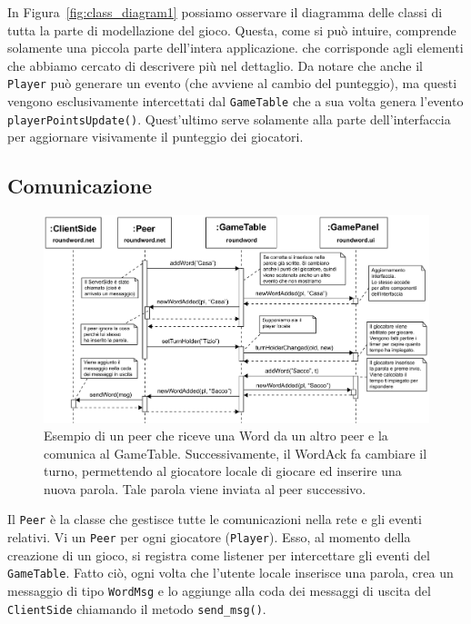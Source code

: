 \documentclass[9pt]{article}
\begin{document}
In Figura~\ref{fig:class_diagram1} possiamo osservare il diagramma delle classi di tutta la parte di modellazione del gioco. Questa, come si può intuire, comprende solamente una piccola parte dell'intera applicazione. che corrisponde agli elementi che abbiamo cercato di descrivere più nel dettaglio. Da notare che anche il \texttt{Player} può generare un evento (che avviene al cambio del punteggio), ma questi vengono esclusivamente intercettati dal \texttt{GameTable} che a sua volta genera l'evento \texttt{playerPointsUpdate()}. Quest'ultimo serve solamente alla parte dell'interfaccia per aggiornare visivamente il punteggio dei giocatori.

\subsection{Comunicazione}

\begin{figure}
	\centering
		\includegraphics[scale=0.51]{imgs/Sequence1.pdf}		
		\caption{Esempio di un peer che riceve una Word da un altro peer e la comunica al GameTable. Successivamente, il WordAck fa cambiare il turno, permettendo al giocatore locale di giocare ed inserire una nuova parola. Tale parola viene inviata al peer successivo.}
		\label{fig:sequence1}
\end{figure}	


Il \texttt{Peer} è la classe che gestisce tutte le comunicazioni nella rete e gli eventi relativi. Vi un \texttt{Peer} per ogni giocatore (\texttt{Player}). Esso, al momento della creazione di un gioco, si registra come listener per intercettare gli eventi del \texttt{GameTable}. Fatto ciò, ogni volta che l'utente locale inserisce una parola, crea un messaggio di tipo \texttt{WordMsg} e lo aggiunge alla coda dei messaggi di uscita del \texttt{ClientSide} chiamando il metodo \texttt{send\_msg()}.
\end{document}

